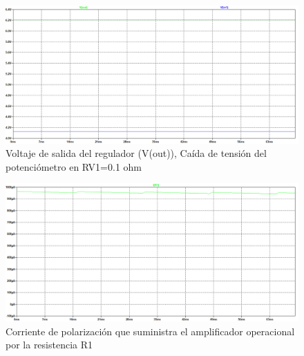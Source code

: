 \begin{enumerate}
\begin{enumerate}
\begin{itemize}
\begin{itemize}
                                    \begin{figure}[H]
                                        \centering
                                        \renewcommand{\figurename}{Gráfica}
                                        \includegraphics[width=15cm]{Imagenes/sim_regulador_sal_ajustable_sinrl3.png}
                                        \caption{Voltaje de salida del regulador (V(out)), Caída de tensión del potenciómetro en RV1=0.1 ohm}
                                        \label{fig:sim_regulador_sal_ajustable_sinrl3}
                                    \end{figure}
                                    \begin{figure}[H]
                                        \centering
                                        \renewcommand{\figurename}{Gráfica}
                                        \includegraphics[width=15cm]{Imagenes/sim_regulador_sal_ajustable_corrientesinrl.png}
                                        \caption{Corriente de polarización que suministra el amplificador operacional por la resistencia R1}
                                        \label{fig:sim_regulador_sal_ajustable_corrientesinrl}
                                    \end{figure}
                                    

\end{itemize}
\end{itemize}
\end{enumerate}
\end{enumerate}
